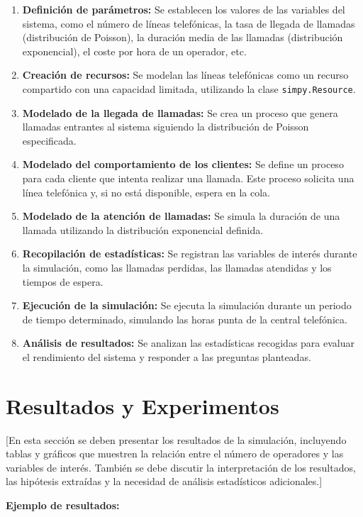 \documentclass{article}
\begin{document}
\begin{enumerate}
    \item \textbf{Definición de parámetros:} Se establecen los valores de las variables del sistema, como el número de líneas telefónicas, la tasa de llegada de llamadas (distribución de Poisson), la duración media de las llamadas (distribución exponencial), el coste por hora de un operador, etc.
    \item \textbf{Creación de recursos:} Se modelan las líneas telefónicas como un recurso compartido con una capacidad limitada, utilizando la clase \texttt{simpy.Resource}.
    \item \textbf{Modelado de la llegada de llamadas:} Se crea un proceso que genera llamadas entrantes al sistema siguiendo la distribución de Poisson especificada.
    \item \textbf{Modelado del comportamiento de los clientes:} Se define un proceso para cada cliente que intenta realizar una llamada. Este proceso solicita una línea telefónica y, si no está disponible, espera en la cola.
    \item \textbf{Modelado de la atención de llamadas:} Se simula la duración de una llamada utilizando la distribución exponencial definida.
    \item \textbf{Recopilación de estadísticas:} Se registran las variables de interés durante la simulación, como las llamadas perdidas, las llamadas atendidas y los tiempos de espera.
    \item \textbf{Ejecución de la simulación:} Se ejecuta la simulación durante un periodo de tiempo determinado, simulando las horas punta de la central telefónica.
    \item \textbf{Análisis de resultados:} Se analizan las estadísticas recogidas para evaluar el rendimiento del sistema y responder a las preguntas planteadas.
\end{enumerate}

\section{Resultados y Experimentos}

[En esta sección se deben presentar los resultados de la simulación, incluyendo tablas y gráficos que muestren la relación entre el número de operadores y las variables de interés. También se debe discutir la interpretación de los resultados, las hipótesis extraídas y la necesidad de análisis estadísticos adicionales.]

\textbf{Ejemplo de resultados:}
\end{document}
